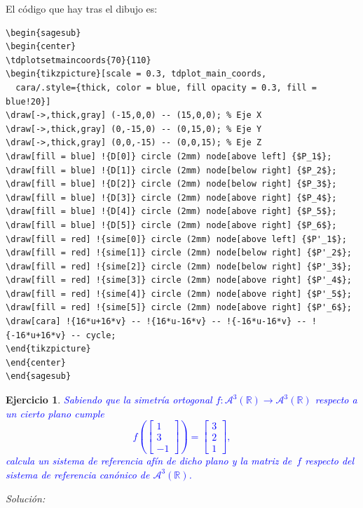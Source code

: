 \documentclass{amsart}
\newtheorem{ejer}{Ejercicio}
\begin{document}
El código que hay tras el dibujo es:
\begin{verbatim}
\begin{sagesub}
\begin{center}
\tdplotsetmaincoords{70}{110}
\begin{tikzpicture}[scale = 0.3, tdplot_main_coords,
  cara/.style={thick, color = blue, fill opacity = 0.3, fill = blue!20}]
\draw[->,thick,gray] (-15,0,0) -- (15,0,0); % Eje X
\draw[->,thick,gray] (0,-15,0) -- (0,15,0); % Eje Y
\draw[->,thick,gray] (0,0,-15) -- (0,0,15); % Eje Z
\draw[fill = blue] !{D[0]} circle (2mm) node[above left] {$P_1$}; 
\draw[fill = blue] !{D[1]} circle (2mm) node[below right] {$P_2$}; 
\draw[fill = blue] !{D[2]} circle (2mm) node[below right] {$P_3$}; 
\draw[fill = blue] !{D[3]} circle (2mm) node[above right] {$P_4$}; 
\draw[fill = blue] !{D[4]} circle (2mm) node[above right] {$P_5$}; 
\draw[fill = blue] !{D[5]} circle (2mm) node[above right] {$P_6$}; 
\draw[fill = red] !{sime[0]} circle (2mm) node[above left] {$P'_1$}; 
\draw[fill = red] !{sime[1]} circle (2mm) node[below right] {$P'_2$}; 
\draw[fill = red] !{sime[2]} circle (2mm) node[below right] {$P'_3$}; 
\draw[fill = red] !{sime[3]} circle (2mm) node[above right] {$P'_4$}; 
\draw[fill = red] !{sime[4]} circle (2mm) node[above right] {$P'_5$}; 
\draw[fill = red] !{sime[5]} circle (2mm) node[above right] {$P'_6$}; 
\draw[cara] !{16*u+16*v} -- !{16*u-16*v} -- !{-16*u-16*v} -- !{-16*u+16*v} -- cycle;
\end{tikzpicture}
\end{center}
\end{sagesub}
\end{verbatim}

\newpage


\begin{ejer}
\textcolor{blue}{Sabiendo que la simetría ortogonal $f:\mathcal{A}^3(\mathbb{R}) \to \mathcal{A}^3(\mathbb{R})$
respecto a un cierto plano cumple 
$$
	f\left(\left[\begin{array}{c}1\\3\\-1\end{array}\right]\right)=\left[\begin{array}{c}3\\2\\1\end{array}\right],
$$ 
calcula un sistema de referencia af\'in de dicho plano y la matriz de~$f$ respecto del sistema de referencia can\'onico
de $\mathcal{A}^3(\mathbb{R})$. }
\end{ejer}
{\it Solución:}
\end{document}
